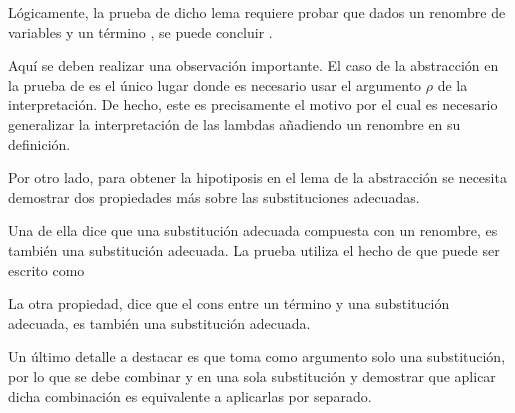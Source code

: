 
Lógicamente, la prueba de dicho lema requiere probar que dados un renombre de variables \bound{$\rho$} y un término , se puede concluir .


Aquí se deben realizar una observación importante.
El caso de la abstracción en la prueba de  es el único lugar donde es necesario usar el argumento $\rho$ de la interpretación.
De hecho, este es precisamente el motivo por el cual es necesario generalizar la interpretación de las lambdas añadiendo un renombre en su definición.

\iffalse
En segundo lugar, en la prueba de \func{SN*-rename} se debe eliminar el renombre del paso de reducción para poder utilizar la hipótesis \bound{SNt}.
Para ello se define el siguiente lema:

\ExecuteMetaData[code/strong_norm_base.tex]{rename-reduction-type}

Básicamente, el lema dice que si una reducción parte de un término renombrado $t_\rho$, el resultado será un término $t'_\rho$, donde $t'$ se obtiene dando un paso de reducción desde $t$.
\fi

Por otro lado, para obtener la hipotiposis  en el lema de la abstracción se necesita demostrar dos propiedades más sobre las substituciones adecuadas.

Una de ella dice que una substitución adecuada compuesta con un renombre, es también una substitución adecuada.
La prueba utiliza el hecho de que   puede ser escrito como
\subst{\comp{\ids}{\bound{$\rho$}}}{}


La otra propiedad, dice que el cons entre un término \snstar y una substitución adecuada, es también una substitución adecuada.


Un último detalle a destacar es que  toma como argumento solo una substitución, por lo que se debe combinar \bound{$\sigma$} y
en una sola substitución y demostrar que aplicar dicha combinación es equivalente a aplicarlas por separado.

